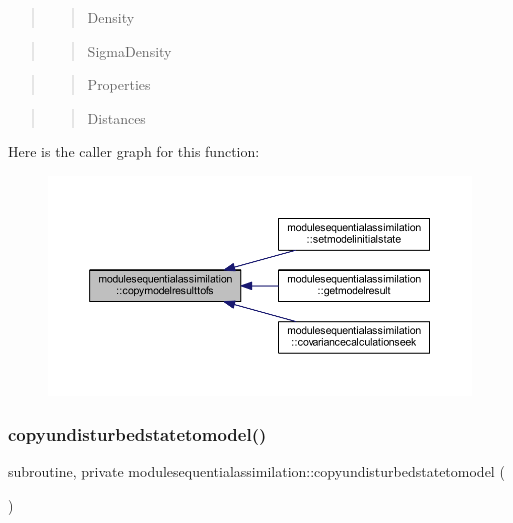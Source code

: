 \begin{quote}
\begin{quote}
Density \end{quote}
\end{quote}


\begin{quote}
\begin{quote}
Sigma\+Density \end{quote}
\end{quote}


\begin{quote}
\begin{quote}
Properties \end{quote}
\end{quote}


\begin{quote}
\begin{quote}
Distances \end{quote}
\end{quote}
Here is the caller graph for this function\+:\nopagebreak
\begin{figure}[H]
\begin{center}
\leavevmode
\includegraphics[width=350pt]{namespacemodulesequentialassimilation_a1a5a1be9fa72ef3b8fe621128b7e3759_icgraph}
\end{center}
\end{figure}
\mbox{\label{namespacemodulesequentialassimilation_ad07159048364faf26c59ebffd5b246a3}} 
\subsubsection{\texorpdfstring{copyundisturbedstatetomodel()}{copyundisturbedstatetomodel()}}
{\footnotesize\ttfamily subroutine, private modulesequentialassimilation\+::copyundisturbedstatetomodel (\begin{DoxyParamCaption}{ }\end{DoxyParamCaption})\hspace{0.3cm}{\ttfamily [private]}}

